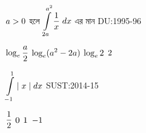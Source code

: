 \documentclass[addpoints]{exam}
\begin{document}
\begin{questions}
\question  $\mathlarger{a>0}$   হলে $\mathlarger{\int\limits_{2a}^{a^2} \frac{1}{x}\;dx}$  এর মান \hfill \textsc{DU:1995-96}

\begin{oneparchoices}

\choice $\mathlarger{\log_e \frac{a}{2}}$
\choice $\mathlarger{\log_e (a^2 -2a)}$
\choice $\mathlarger{\log_e 2}$
\choice $\mathlarger{2}$
\end{oneparchoices}

\question  $\mathlarger{\int\limits_{-1}^{1} \mid  x \mid dx}$   \hfill \textsc{SUST:2014-15}

\begin{oneparchoices}
 \choice $\mathlarger{\frac{1}{2}}$
 \choice $\mathlarger{0}$
 \choice $\mathlarger{1}$
 \choice $\mathlarger{-1}$
\end{oneparchoices}

\end{questions}
\end{document}
